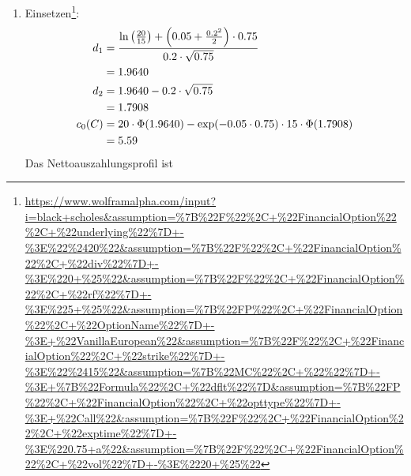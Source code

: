 \documentclass{article}
\begin{document}
	\begin{enumerate}[label=(\alph*)]
		\item Einsetzen\footnote{\url{https://www.wolframalpha.com/input?i=black+scholes\&assumption=\%7B\%22F\%22\%2C+\%22FinancialOption\%22\%2C+\%22underlying\%22\%7D+-\%3E\%22\%2420\%22\&assumption=\%7B\%22F\%22\%2C+\%22FinancialOption\%22\%2C+\%22div\%22\%7D+-\%3E\%220+\%25\%22\&assumption=\%7B\%22F\%22\%2C+\%22FinancialOption\%22\%2C+\%22rf\%22\%7D+-\%3E\%225+\%25\%22\&assumption=\%7B\%22FP\%22\%2C+\%22FinancialOption\%22\%2C+\%22OptionName\%22\%7D+-\%3E+\%22VanillaEuropean\%22\&assumption=\%7B\%22F\%22\%2C+\%22FinancialOption\%22\%2C+\%22strike\%22\%7D+-\%3E\%22\%2415\%22\&assumption=\%7B\%22MC\%22\%2C+\%22\%22\%7D+-\%3E+\%7B\%22Formula\%22\%2C+\%22dflt\%22\%7D\&assumption=\%7B\%22FP\%22\%2C+\%22FinancialOption\%22\%2C+\%22opttype\%22\%7D+-\%3E+\%22Call\%22\&assumption=\%7B\%22F\%22\%2C+\%22FinancialOption\%22\%2C+\%22exptime\%22\%7D+-\%3E\%220.75+a\%22\&assumption=\%7B\%22F\%22\%2C+\%22FinancialOption\%22\%2C+\%22vol\%22\%7D+-\%3E\%2220+\%25\%22}}:
		\begin{align}
			d_1 &= \frac{\ln\left(\frac{20}{15}\right) + \left(0.05+\frac{0.2^2}{2}\right)\cdot 0.75}{0.2\cdot\sqrt{0.75}} \notag \\
			&= 1.9640 \notag \\
			d_2 &= 1.9640 - 0.2\cdot\sqrt{0.75} \notag \\
			&= 1.7908 \notag \\
			c_0(C) &= 20\cdot\Phi(1.9640) - \exp(-0.05\cdot 0.75)\cdot 15\cdot \Phi(1.7908) \notag \\
			&= 5.59 \notag
		\end{align}
		Das Nettoauszahlungsprofil ist
		\begin{center}
\end{center}
\end{enumerate}
\end{document}
